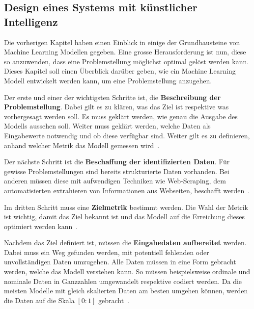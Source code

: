 
\subsection{Design eines Systems mit künstlicher Intelligenz}

Die vorherigen Kapitel haben einen Einblick in einige der Grundbausteine von Machine Learning Modellen gegeben. Eine grosse Herausforderung ist nun, diese so anzuwenden, dass eine Problemstellung möglichst optimal gelöst werden kann. Dieses Kapitel soll einen Überblick darüber geben, wie ein Machine Learning Modell entwickelt werden kann, um eine Problemstellung anzugehen.

Der erste und einer der wichtigsten Schritte ist, die \textbf{Beschreibung der Problemstellung}. Dabei gilt es zu klären, was das Ziel ist respektive was vorhergesagt werden soll. Es muss geklärt werden, wie genau die Ausgabe des Modells aussehen soll. Weiter muss geklärt werden, welche Daten als Eingabewerte notwendig und ob diese verfügbar sind. Weiter gilt es zu definieren, anhand welcher Metrik das Modell gemessen wird~\autocite{DesignML}.

Der nächste Schritt ist die \textbf{Beschaffung der identifizierten Daten}. Für gewisse Problemstellungen sind bereits strukturierte Daten vorhanden. Bei anderen müssen diese mit aufwendigen Techniken wie Web-Scraping, dem automatisierten extrahieren von Informationen aus Webseiten, beschafft werden~\autocite{DesignML}.

Im dritten Schritt muss eine \textbf{Zielmetrik} bestimmt werden. Die Wahl der Metrik ist wichtig, damit das Ziel bekannt ist und das Modell auf die Erreichung dieses optimiert werden kann~\autocite{DesignML}.

Nachdem das Ziel definiert ist, müssen die \textbf{Eingabedaten aufbereitet} werden. Dabei muss ein Weg gefunden werden, mit potentiell fehlenden oder unvollständigen Daten umzugehen. Alle Daten müssen in eine Form gebracht werden, welche das Modell verstehen kann. So müssen beispielsweise ordinale und nominale Daten in Ganzzahlen umgewandelt respektive codiert werden. Da die meisten Modelle mit gleich skalierten Daten am besten umgehen können, werden die Daten auf die Skala $[0:1]$ gebracht~\autocite{DesignML}.

